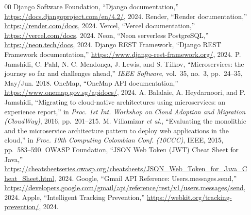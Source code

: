 \documentclass[conference]{IEEEtran}
\begin{document}
\begin{thebibliography}{00}
 Django Software Foundation, ``Django documentation,'' \url{https://docs.djangoproject.com/en/4.2/}, 2024.
 Render, ``Render documentation,'' \url{https://render.com/docs}, 2024.
 Vercel, ``Vercel documentation,'' \url{https://vercel.com/docs}, 2024.
 Neon, ``Neon serverless PostgreSQL,'' \url{https://neon.tech/docs}, 2024.
 Django REST Framework, ``Django REST Framework documentation,'' \url{https://www.django-rest-framework.org/}, 2024.
 P. Jamshidi, C. Pahl, N. C. Mendon\c{c}a, J. Lewis, and S. Tilkov, ``Microservices: the journey so far and challenges ahead,'' \textit{IEEE Software}, vol.~35, no.~3, pp.~24--35, May/Jun. 2018.
 OneMap, ``OneMap API documentation,'' \url{https://www.onemap.gov.sg/apidocs/}, 2024.
 A. Balalaie, A. Heydarnoori, and P. Jamshidi, ``Migrating to cloud-native architectures using microservices: an experience report,'' in \textit{Proc. 1st Int. Workshop on Cloud Adoption and Migration (CloudWay)}, 2016, pp.~201--215.
 M. Villamizar \textit{et al.}, ``Evaluating the monolithic and the microservice architecture pattern to deploy web applications in the cloud,'' in \textit{Proc. 10th Computing Colombian Conf. (10CCC)}, IEEE, 2015, pp.~583--590.
 OWASP Foundation, ``JSON Web Token (JWT) Cheat Sheet for Java,'' \url{https://cheatsheetseries.owasp.org/cheatsheets/JSON_Web_Token_for_Java_Cheat_Sheet.html}, 2024.
 Google, ``Gmail API Reference: Users.messages.send,'' \url{https://developers.google.com/gmail/api/reference/rest/v1/users.messages/send}, 2024.
 Apple, ``Intelligent Tracking Prevention,'' \url{https://webkit.org/tracking-prevention/}, 2024.
\end{thebibliography}
\end{document}
